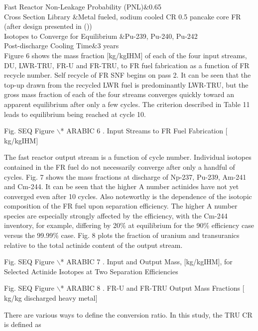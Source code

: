 Fast Reactor Non-Leakage Probability (PNL)&0.65\\

Cross Section Library &Metal fueled, sodium cooled CR 0.5 pancake core
FR (after design presented in ())\\

Isotopes to Converge for Equilibrium &Pu-239, Pu-240, Pu-242\\

Post-discharge Cooling Time&3 years\\



	Figure 6 shows the mass fraction $[$kg/kgIHM$]$ of each of the four
input streams, DU, LWR-TRU, FR-U and FR-TRU, to FR fuel fabrication as a
function of FR recycle number.  Self recycle of FR SNF begins on pass 2.
 It can be seen that the top-up drawn from the recycled LWR fuel is
predominantly LWR-TRU, but the gross mass fraction of each of the four
streams converges quickly toward an apparent equilibrium after only a
few cycles.  The criterion described in Table 11 leads to equilibrium
being reached at cycle 10.

Fig.   SEQ Figure $\backslash$* ARABIC  6 . Input Streams to FR Fuel
Fabrication $[$kg/kgIHM$]$

	The fast reactor output stream is a function of cycle number. 
Individual isotopes contained in the FR fuel do not necessarily converge
after only a handful of cycles.  Fig. 7 shows the mass fractions at
discharge of Np-237, Pu-239, Am-241 and Cm-244.  It can be seen that the
higher A number actinides have not yet converged even after 10 cycles. 
Also noteworthy is the dependence of the isotopic composition of the FR
fuel upon separation efficiency.  The higher A number species are
especially strongly affected by the efficiency, with the Cm-244
inventory, for example, differing by 20\% at equilibrium for the 90\%
efficiency case versus the 99.99\% case.  Fig. 8 plots the fraction of
uranium and transuranics relative to the total actinide content of the
output stream.

Fig.   SEQ Figure $\backslash$* ARABIC  7 .  Input and Output Mass,
$[$kg/kgIHM$]$, for Selected Actinide Isotopes at Two Separation
Efficiencies

Fig.   SEQ Figure $\backslash$* ARABIC  8 . FR-U and FR-TRU Output Mass
Fractions $[$kg/kg discharged heavy metal$]$

	There are various ways to define the conversion ratio.  In this study,
the TRU CR is defined as

